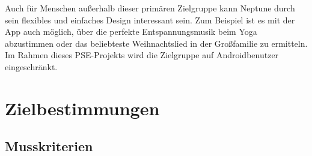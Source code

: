 \documentclass[oneside, ngerman]{sdqtechreport}
\begin{document}
Auch für Menschen außerhalb dieser primären Zielgruppe kann Neptune durch sein flexibles und einfaches Design interessant sein. Zum Beispiel ist es mit der App auch möglich, über die perfekte Entspannungsmusik beim Yoga abzustimmen oder das beliebteste Weihnachtslied in der Großfamilie zu ermitteln. 
Im Rahmen dieses PSE-Projekts wird die Zielgruppe auf Androidbenutzer eingeschränkt.

\chapter{Zielbestimmungen}
\label{chap:Zielbestimmungen}

\section{Musskriterien}
\label{sec:Zielbestimmungen:Musskriterien}
\end{document}
